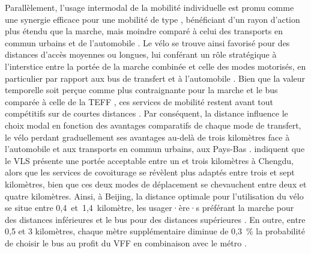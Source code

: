 \begin{refsegment}
Parallèlement, l'usage intermodal de la mobilité individuelle est promu comme une synergie efficace pour une mobilité de type , bénéficiant d'un rayon d'action plus étendu que la marche, mais moindre comparé à celui des transports en commun urbains et de l'automobile \textcolor{blue}{\autocite[1934]{chen_study_2013}}. Le vélo se trouve ainsi favorisé pour des distances d'accès moyennes ou longues, lui conférant un rôle stratégique à l'interstice entre la portée de la marche combinée et celle des modes motorisés, en particulier par rapport aux bus de transfert et à l'automobile \textcolor{blue}{\autocite[1266]{chen_demand_2013}}. Bien que la valeur temporelle soit perçue comme plus contraignante pour la marche et le bus comparée à celle de la \acrshort{TEFF} \textcolor{blue}{\autocite[9]{baek_electric_2021}}, ces services de mobilité restent avant tout compétitifs sur de courtes distances \textcolor{blue}{\autocite[4~ 17]{lee_forecasting_2021}}. Par conséquent, la distance influence le choix modal en fonction des avantages comparatifs de chaque mode de transfert, le vélo perdant graduellement ses avantages au-delà de trois kilomètres face à l'automobile et aux transports en commun urbains, aux Pays-Bas \textcolor{blue}{\autocite[359]{givoni_access_2007}}. \textcolor{blue}{\textcite[885]{bi_analysis_2021}} indiquent que le \acrshort{VLS} présente une portée acceptable entre un et trois kilomètres à Chengdu, alors que les services de covoiturage se révèlent plus adaptés entre trois et sept kilomètres, bien que ces deux modes de déplacement se chevauchent entre deux et quatre kilomètres. Ainsi, à Beijing, la distance optimale pour l'utilisation du vélo se situe entre 0,4~et~1,4~kilomètre, les usager·ère·s préférant la marche pour des distances inférieures et le bus pour des distances supérieures \textcolor{blue}{\autocite[5]{wang_interchange_2016}}. En outre, entre 0,5 et 3 kilomètres, chaque mètre supplémentaire diminue de 0,3~\% la probabilité de choisir le bus au profit du \acrshort{VFF} en combinaison avec le métro \textcolor{blue}{\autocite[5]{liu_mode_2022}}.%


\end{refsegment}
